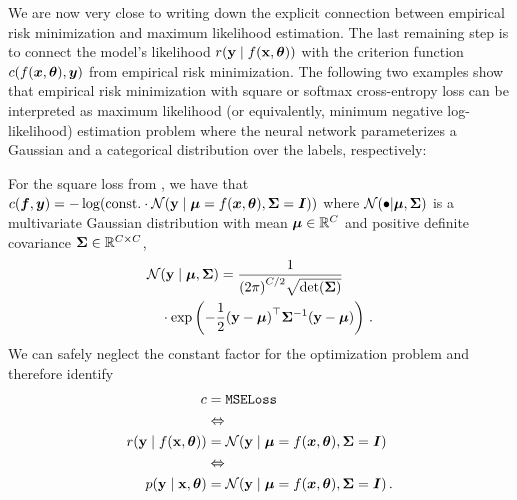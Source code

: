 We are now very close to writing down the explicit connection between empirical risk minimization and maximum likelihood estimation.
The last remaining step is to connect the model's likelihood $r({\mathbf{y}} \mid f({\mathbf{x}}, {\bm{\theta}}))$ with the criterion function $c(f({\bm{x}}, {\bm{\theta}}), {\bm{y}})$ from empirical risk minimization.
The following two examples show that empirical risk minimization with square or softmax cross-entropy loss can be interpreted as maximum likelihood (or equivalently, minimum negative log-likelihood) estimation problem where the neural network parameterizes a Gaussian and a categorical distribution over the labels, respectively:

\begin{example}\label{ex:square_loss_probabilistic}
  For the square loss from , we have that $c({\bm{f}}, {\bm{y}}) = - \log( \mathrm{const.}
    \cdot {\mathcal{N}}({\mathbf{y}} \mid {\bm{\mu}} = f({\bm{x}}, {\bm{\theta}}), {\bm{\Sigma}} = {\bm{I}}))$ where ${\mathcal{N}}(\bullet | {\bm{\mu}}, {\bm{\Sigma}})$ is a multivariate Gaussian distribution with mean ${\bm{\mu}} \in {\mathbb{R}}^C$ and positive definite covariance ${\bm{\Sigma}} \in {\mathbb{R}}^{C \times C}$,
  \begin{align*}
     & {\mathcal{N}}({\mathbf{y}} \mid {\bm{\mu}}, {\bm{\Sigma}}) = \frac{1}{{(2\pi)}^{C/2} \sqrt{\det({\bm{\Sigma}})}}
    \\
     & \hspace{1em}\cdot \exp\left( -\frac{1}{2} {({\mathbf{y}} - {\bm{\mu}})}^\top {\bm{\Sigma}}^{-1} ({\mathbf{y}} - {\bm{\mu}}) \right)\,.
  \end{align*}
  We can safely neglect the constant factor for the optimization problem and therefore identify
  \begin{align*}
    c                             & = \text{\texttt{MSELoss}}
    \\
                                  & \Leftrightarrow
    \\
    r({\mathbf{y}} \mid f({\mathbf{x}}, {\bm{\theta}})) & = {\mathcal{N}}({\mathbf{y}} \mid {\bm{\mu}} = f({\bm{x}}, {\bm{\theta}}), {\bm{\Sigma}} = {\bm{I}})\,
    \\
                                  & \Leftrightarrow
    \\
    p({\mathbf{y}} \mid {\mathbf{x}}, {\bm{\theta}})    & = {\mathcal{N}}({\mathbf{y}} \mid {\bm{\mu}} = f({\bm{x}}, {\bm{\theta}}), {\bm{\Sigma}} = {\bm{I}})\,.
  \end{align*}
\end{example}


